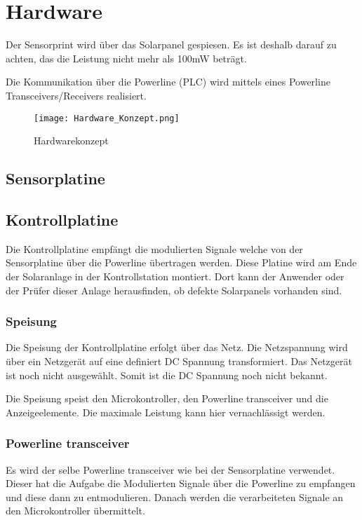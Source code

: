 %
%
%

\section{Hardware}

Der Sensorprint wird über das Solarpanel gespiesen. Es ist deshalb darauf zu achten, das die Leistung nicht mehr als 100mW beträgt.

Die Kommunikation über die Powerline (PLC) wird mittels eines Powerline Transceivers/Receivers realisiert.
\begin{figure}[h]
\centering
\texttt{[image: Hardware\_Konzept.png]}%
\caption{Hardwarekonzept}
\label{fig::Hardwarekonzept}%
\end{figure}

\subsection{Sensorplatine}

\subsection{Kontrollplatine}
Die Kontrollplatine empfängt die modulierten Signale welche von der Sensorplatine über die Powerline übertragen werden. Diese Platine wird am Ende der Solaranlage in der Kontrollstation montiert. Dort kann der Anwender oder der Prüfer dieser Anlage herausfinden, ob defekte Solarpanels vorhanden sind.

\subsubsection{Speisung}
Die Speisung der Kontrollplatine erfolgt über das Netz. Die Netzspannung wird über ein Netzgerät auf eine definiert DC Spannung transformiert. Das Netzgerät ist noch nicht ausgewählt. Somit ist die DC Spannung noch nicht bekannt.

Die Speisung speist den Microkontroller, den Powerline transceiver und die Anzeigeelemente. Die maximale Leistung kann hier vernachlässigt werden.

\subsubsection{Powerline transceiver}
Es wird der selbe Powerline transceiver wie bei der Sensorplatine verwendet. Dieser hat die Aufgabe die Modulierten Signale über die Powerline zu empfangen und diese dann zu entmodulieren. Danach werden die verarbeiteten Signale an den Microkontroller übermittelt.

